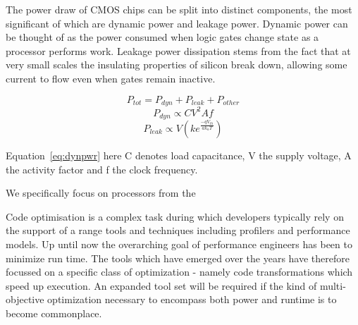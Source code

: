 The power draw of CMOS chips can be split into distinct components, the most significant of which are dynamic power and leakage power. Dynamic power can be thought of as the power consumed when logic gates change state as a processor performs work. Leakage power dissipation stems from the fact that at very small scales the insulating properties of silicon break down, allowing some current to flow even when gates remain inactive.




\begin{equation}
\label{eq:totpwr}
P_{tot} = P_{dyn} + P_{leak} + P_{other}
\end{equation}
\begin{equation} 
\label{eq:dynpwr}
P_{dyn} \propto CV^{2}Af
\end{equation}
\begin{equation}
\label{eq:leakpwr}
P_{leak} \propto V\left(ke^{\frac{-qV_{th}}{ak_{a}T}}\right)
\end{equation}

 Equation~\ref{eq:dynpwr} 
here C denotes load capacitance, V the supply voltage, A the activity factor and f the clock frequency.















 We specifically focus on processors from the



Code optimisation is a complex task during which developers typically rely on the support of a range tools and techniques including profilers and performance models. Up until now the overarching goal of performance engineers has been to minimize run time. The tools which have emerged over the years have therefore focussed on a specific class of optimization - namely code transformations which speed up execution. An expanded tool set will be required if the kind of multi-objective optimization necessary to encompass both power and runtime is to become commonplace.

